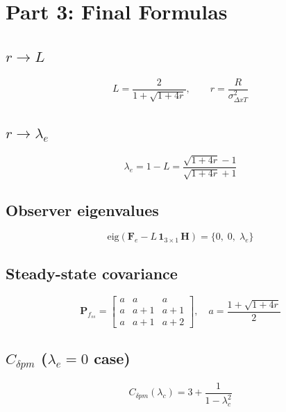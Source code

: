 \documentclass[11pt]{article}
\newcommand{\Fe}{\mathbf{F}_e}
\newcommand{\Hm}{\mathbf{H}}
\newcommand{\Pf}{\mathbf{P}_f}
\begin{document}
\section*{Part 3: Final Formulas}

\subsection*{$r \to L$}
\begin{equation}
\boxed{L = \frac{2}{1+\sqrt{1+4r}}, \qquad r = \frac{R}{\sigma^2_{\Delta xT}}}
\end{equation}

\subsection*{$r \to \lambda_e$}
\begin{equation}
\boxed{\lambda_e = 1 - L = \frac{\sqrt{1+4r}-1}{\sqrt{1+4r}+1}}
\end{equation}

\subsection*{Observer eigenvalues}
\begin{equation}
\text{eig}(\Fe - L\,\mathbf{1}_{3\times1}\,\Hm) = \{0,\;0,\;\lambda_e\}
\end{equation}

\subsection*{Steady-state covariance}
\begin{equation}
\Pf_{ss} = \begin{bmatrix} a & a & a \\ a & a\!+\!1 & a\!+\!1 \\ a & a\!+\!1 & a\!+\!2 \end{bmatrix}, \quad
a = \frac{1+\sqrt{1+4r}}{2}
\end{equation}

\subsection*{$C_{\delta pm}$ ($\lambda_e = 0$ case)}
\begin{equation}
C_{\delta pm}(\lambda_c) = 3 + \frac{1}{1-\lambda_c^2}
\end{equation}
\end{document}
